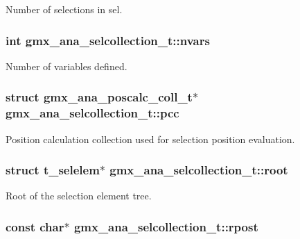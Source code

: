 \-Number of selections in {\ttfamily sel}. \hypertarget{structgmx__ana__selcollection__t_a37024150813423ca2e30869386357f24}{
\subsubsection[{nvars}]{\setlength{\rightskip}{0pt plus 5cm}int {\bf gmx\-\_\-ana\-\_\-selcollection\-\_\-t\-::nvars}}}\label{structgmx__ana__selcollection__t_a37024150813423ca2e30869386357f24}
\-Number of variables defined. \hypertarget{structgmx__ana__selcollection__t_a06323c0a4407a965e4b9ae1b5a983421}{
\subsubsection[{pcc}]{\setlength{\rightskip}{0pt plus 5cm}struct {\bf gmx\-\_\-ana\-\_\-poscalc\-\_\-coll\-\_\-t}$\ast$ {\bf gmx\-\_\-ana\-\_\-selcollection\-\_\-t\-::pcc}}}\label{structgmx__ana__selcollection__t_a06323c0a4407a965e4b9ae1b5a983421}
\-Position calculation collection used for selection position evaluation. \hypertarget{structgmx__ana__selcollection__t_a737b4bcd43cfc06f937d384ee0454b3a}{
\subsubsection[{root}]{\setlength{\rightskip}{0pt plus 5cm}struct {\bf t\-\_\-selelem}$\ast$ {\bf gmx\-\_\-ana\-\_\-selcollection\-\_\-t\-::root}}}\label{structgmx__ana__selcollection__t_a737b4bcd43cfc06f937d384ee0454b3a}
\-Root of the selection element tree. \hypertarget{structgmx__ana__selcollection__t_ae4a7c78bd05cc8563ff257981304379d}{
\subsubsection[{rpost}]{\setlength{\rightskip}{0pt plus 5cm}const char$\ast$ {\bf gmx\-\_\-ana\-\_\-selcollection\-\_\-t\-::rpost}}}\label{structgmx__ana__selcollection__t_ae4a7c78bd05cc8563ff257981304379d}
